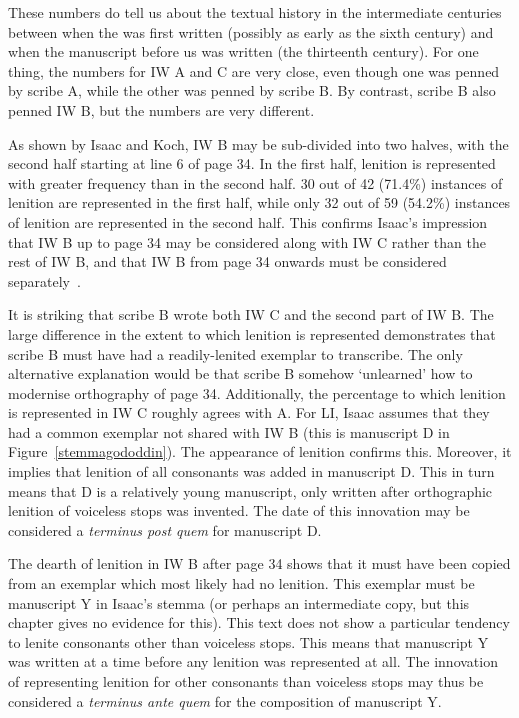 These numbers do tell us about the textual history in the intermediate centuries between when the  was first written (possibly as early as the sixth century) and when the manuscript before us was written (the thirteenth century). For one thing, the numbers for IW A and C are very close, even though one was penned  by scribe A, while the other was penned  by scribe B. By contrast, scribe B also penned  IW B, but the numbers are very different.

As shown by Isaac and Koch, IW B may be sub-divided into two halves, with the second half starting at line 6 of page 34. In the first half, lenition is represented with greater frequency than in the second half. 30 out of 42 (71.4\%) instances of lenition are represented  in the first half, while only 32 out of 59 (54.2\%) instances of lenition are represented in the second half. This confirms Isaac's impression that IW B up to page 34 may be considered along with IW C rather than the rest of IW B, and that IW B from page 34 onwards must be considered separately~\autocite[87]{isaac_canu_1993}.

It is striking that scribe B wrote both IW C and the second part of IW B. The large difference in the extent to which lenition is represented demonstrates that scribe B must have had a readily-lenited exemplar to transcribe. The only alternative explanation would be that scribe B somehow `unlearned' how to modernise orthography of page 34. Additionally, the percentage to which lenition is represented in IW C roughly agrees with A. For  LI, Isaac assumes that they had a common exemplar not shared with IW B (this is manuscript D in Figure~\ref{stemmagododdin}). The appearance of lenition confirms this. Moreover, it implies that lenition of all consonants was added in manuscript D. This in turn means that D is a relatively young manuscript, only written after orthographic lenition of voiceless stops was invented. The date of this innovation may be considered a \emph{terminus post quem} for manuscript D.

The dearth of lenition in IW B after page 34 shows that it must have been copied from an exemplar which most likely had no lenition. This exemplar must be manuscript Y in Isaac's stemma (or perhaps an intermediate copy, but this chapter gives no evidence for this). This text does not show a particular tendency to lenite consonants other than voiceless stops. This means that manuscript Y was written at a time before any lenition was represented at all. The innovation of representing lenition for other consonants than voiceless stops may thus be considered a \emph{terminus ante quem} for the composition of manuscript Y.

